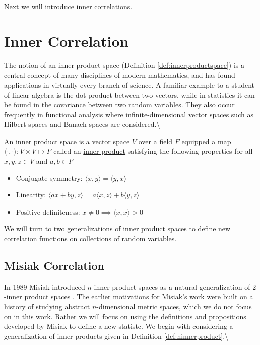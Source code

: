 \documentclass[
  letterpaper,
  DIV=11,
  numbers=noendperiod]{scrreprt}
\begin{document}
Next we will introduce inner correlations.

\section{Inner Correlation}\label{inner-correlation}

The notion of an inner product space (Definition
\ref{def:innerproductspace}) is a central concept of many disciplines of
modern mathematics, and has found applications in virtually every branch
of science. A familiar example to a student of linear algebra is the dot
product between two vectors, while in statistics it can be found in the
covariance between two random variables. They also occur frequently in
functional analysis where infinite-dimensional vector spaces such as
Hilbert spaces and Banach spaces are considered.\textbackslash{}

\begin{Definition}[mydefinition=Inner Product Space, label=def:innerproductspace]
An \underline{inner product space} is a vector space $V$ over a field $F$ equipped a map $\langle \cdot, \cdot \rangle : V \times V \mapsto F$ called an \underline{inner product} satisfying the following properties for all $x,y,z \in V$ and $a,b \in F$

\begin{itemize}
    \item Conjugate symmetry:  $\langle x, y \rangle = \overline{\langle y, x \rangle}$
    \item Linearity: $\langle ax + by, z \rangle = a\langle x, z \rangle + b\langle y, z \rangle$
    \item Positive-definiteness: $x \neq 0 \implies \langle x, x \rangle > 0$
\end{itemize} 
\end{Definition}

We will turn to two generalizations of inner product spaces to define
new correlation functions on collections of random variables.

\subsection{Misiak Correlation}\label{misiak-correlation}

In 1989 Misiak introduced \(n\)-inner product spaces as a natural
generalization of \(2\)-inner product spaces \cite{Misiak1989}. The
earlier motivations for Misiak's work were built on a history of
studying abstract \(n\)-dimensional metric spaces, which we do not focus
on in this work. Rather we will focus on using the definitions and
propositions developed by Misiak to define a new statistc. We begin with
considering a generalization of inner products given in Definition
\ref{def:ninnerproduct}.\textbackslash{}
\end{document}
